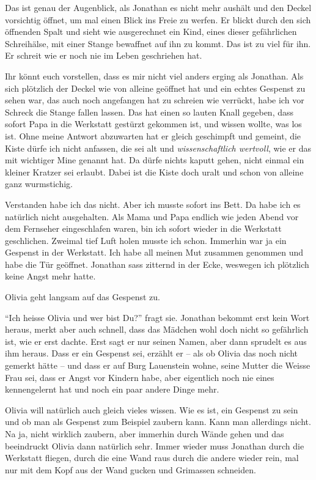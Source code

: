 Das ist genau der Augenblick, als Jonathan es nicht mehr aushält und den Deckel vorsichtig öffnet, um mal einen Blick ins Freie zu werfen. Er blickt durch den sich öffnenden Spalt und sieht wie ausgerechnet ein Kind, eines dieser gefährlichen Schreihälse, mit einer Stange bewaffnet auf ihn zu kommt. Das ist zu viel für ihn. Er schreit wie er noch nie im Leben geschriehen hat.

\begin{mdframed}[style=mystyle]
  Ihr könnt euch vorstellen, dass es mir nicht viel anders erging als Jonathan. Als sich plötzlich der Deckel wie von alleine geöffnet hat und ein echtes Gespenst zu sehen war, das auch noch angefangen hat zu schreien wie verrückt, habe ich vor Schreck die Stange fallen lassen. Das hat einen so lauten Knall gegeben, dass sofort Papa in die Werkstatt gestürzt gekommen ist, und wissen wollte, was los ist. Ohne meine Antwort abzuwarten hat er gleich geschimpft und gemeint, die Kiste dürfe ich nicht anfassen, die sei alt und \emph{wissenschaftlich wertvoll}, wie er das mit wichtiger Mine genannt hat. Da dürfe nichts kaputt gehen, nicht einmal ein kleiner Kratzer sei erlaubt. Dabei ist die Kiste doch uralt und schon von alleine ganz wurmstichig. 
  
Verstanden habe ich das nicht. Aber ich musste sofort ins Bett. Da habe ich es natürlich nicht ausgehalten. Als Mama und Papa endlich wie jeden Abend vor dem Fernseher eingeschlafen waren, bin ich sofort wieder in die Werkstatt geschlichen. Zweimal tief Luft holen musste ich schon. Immerhin war ja ein Gespenst in der Werkstatt. Ich habe all meinen Mut zusammen genommen und habe die Tür geöffnet. Jonathan sass zitternd in der Ecke, weswegen ich plötzlich keine Angst mehr hatte. 
\end{mdframed}

Olivia geht langsam auf das Gespenst zu. 

\enquote{Ich heisse Olivia und wer bist Du?} fragt sie. Jonathan bekommt erst kein Wort heraus, merkt aber auch schnell, dass das Mädchen wohl doch nicht so gefährlich ist, wie er erst dachte. Erst sagt er nur seinen Namen, aber dann sprudelt es aus ihm heraus. Dass er ein Gespenst sei, erzählt er -- als ob Olivia das noch nicht gemerkt hätte -- und dass er auf Burg Lauenstein wohne, seine Mutter die Weisse Frau sei, dass er Angst vor Kindern habe, aber eigentlich noch nie eines kennengelernt hat und noch ein paar andere Dinge mehr. 

Olivia will natürlich auch gleich vieles wissen. Wie es ist, ein Gespenst zu sein und ob man als Gespenst zum Beispiel zaubern kann. Kann man allerdings nicht. Na ja, nicht wirklich zaubern, aber immerhin durch Wände gehen und das beeindruckt Olivia dann natürlich sehr. Immer wieder muss Jonathan durch die Werkstatt fliegen, durch die eine Wand raus durch die andere wieder rein, mal nur mit dem Kopf aus der Wand gucken und Grimassen schneiden. 

